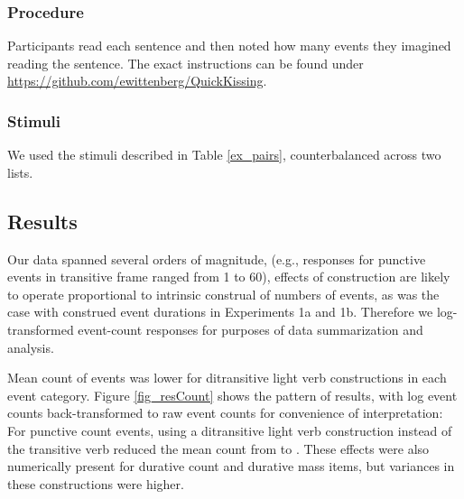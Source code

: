 \documentclass[review,12pt,authoryear]{elsarticle}
\newcommand*{\sectionformat}{\centering}
\begin{document}
\subsubsection*{Procedure}\label{sec_procHowMany}
Participants read each sentence and then noted how many events they imagined reading the sentence. The exact instructions can be found under \url{https://github.com/ewittenberg/QuickKissing}.

\subsubsection*{Stimuli}\label{sec_stimHowMany}
We used the stimuli described in Table \ref{ex_pairs}, counterbalanced across two lists. 

\subsection*{\sectionformat Results}\label{sec_resHowMany}
Our data spanned several orders of magnitude, (e.g., responses for punctive events in transitive frame ranged from 1 to 60), effects of construction are likely to operate proportional to intrinsic construal of numbers of events, as was the case with construed event durations in Experiments 1a and 1b.  Therefore we log-transformed event-count responses for purposes of data summarization and analysis. 

Mean count of events was lower for ditransitive light verb constructions in each event category. Figure \ref{fig_resCount}  shows the pattern of results, with log event counts back-transformed to raw event counts for convenience of interpretation: For punctive count events, using a ditransitive light verb construction instead of the transitive verb reduced the mean count from  to . These effects were also numerically present for durative count and durative mass items, but variances in these constructions were higher.
\end{document}
